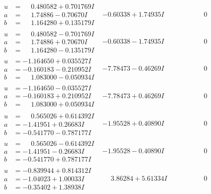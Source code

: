 \documentclass[1p]{elsarticle_modified}
\theoremstyle{definition}
\begin{document}
$$\begin{array}{c|c|c}
\begin{aligned}
u &= \phantom{-}0.480582 + 0.701769 I \\
a &= \phantom{-}1.74886 - 0.70670 I \\
b &= \phantom{-}1.164280 + 0.135179 I\end{aligned}
 & -0.60338 + 1.74935 I & \phantom{-0.000000 } 0 \\ \hline\begin{aligned}
u &= \phantom{-}0.480582 - 0.701769 I \\
a &= \phantom{-}1.74886 + 0.70670 I \\
b &= \phantom{-}1.164280 - 0.135179 I\end{aligned}
 & -0.60338 - 1.74935 I & \phantom{-0.000000 } 0 \\ \hline\begin{aligned}
u &= -1.164650 + 0.035527 I \\
a &= -0.160183 - 0.210952 I \\
b &= \phantom{-}1.083000 - 0.050934 I\end{aligned}
 & -7.78473 - 0.46269 I & \phantom{-0.000000 } 0 \\ \hline\begin{aligned}
u &= -1.164650 - 0.035527 I \\
a &= -0.160183 + 0.210952 I \\
b &= \phantom{-}1.083000 + 0.050934 I\end{aligned}
 & -7.78473 + 0.46269 I & \phantom{-0.000000 } 0 \\ \hline\begin{aligned}
u &= \phantom{-}0.565026 + 0.614392 I \\
a &= -1.41951 + 0.26683 I \\
b &= -0.541770 - 0.787177 I\end{aligned}
 & -1.95528 + 0.40890 I & \phantom{-0.000000 } 0 \\ \hline\begin{aligned}
u &= \phantom{-}0.565026 - 0.614392 I \\
a &= -1.41951 - 0.26683 I \\
b &= -0.541770 + 0.787177 I\end{aligned}
 & -1.95528 - 0.40890 I & \phantom{-0.000000 } 0 \\ \hline\begin{aligned}
u &= -0.839944 + 0.814312 I \\
a &= -1.04023 + 1.00033 I \\
b &= -0.35402 + 1.38938 I\end{aligned}
 & \phantom{-}3.86284 + 5.61334 I & \phantom{-0.000000 } 0 \\ \hline\begin{aligned}

\end{aligned}
\end{array}$$
\end{document}
